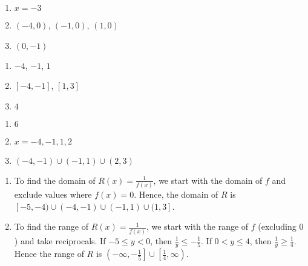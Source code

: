\documentclass{ximera}
\begin{document}
\begin{multicols}{3}
\begin{enumerate}
\setcounter{enumi}{\value{HW}}

\item  $x=-3$
\item $(-4,0)$, $(-1,0)$, $(1,0)$
\item  $(0,-1)$

\setcounter{HW}{\value{enumi}}
\end{enumerate}
\end{multicols}

\begin{multicols}{3}
\begin{enumerate}
\setcounter{enumi}{\value{HW}}

\item  $-4$, $-1$, $1$
\item  $[-4,-1]$, $[1,3]$
\item  $4$

\setcounter{HW}{\value{enumi}}
\end{enumerate}
\end{multicols}


\begin{multicols}{3}
\begin{enumerate}
\setcounter{enumi}{\value{HW}}

\item  $6$
\item  $x=-4, -1,1,2$
\item  $(-4,-1) \cup (-1,1) \cup (2,3)$ 

\setcounter{HW}{\value{enumi}}
\end{enumerate}
\end{multicols}

\begin{enumerate}
\setcounter{enumi}{\value{HW}}

\item To find the domain of $R(x) = \frac{1}{f(x)}$, we start with the domain of $f$ and exclude values where $f(x) = 0$.  Hence, the domain of $R$ is $[-5,-4) \cup (-4,-1) \cup (-1,1) \cup (1,3]$.

\item  To find the range of $R(x) = \frac{1}{f(x)}$, we start with the range of $f$ (excluding $0$)  and take reciprocals.  If $-5 \leq y < 0$, then $\frac{1}{y} \leq -\frac{1}{5}$.  If $0 < y \leq 4$, then $\frac{1}{y} \geq \frac{1}{4}$. Hence the range of $R$ is $\left(-\infty, -\frac{1}{5} \right] \cup \left[ \frac{1}{4}, \infty \right)$. 

\setcounter{HW}{\value{enumi}}
\end{enumerate}
\end{document}

